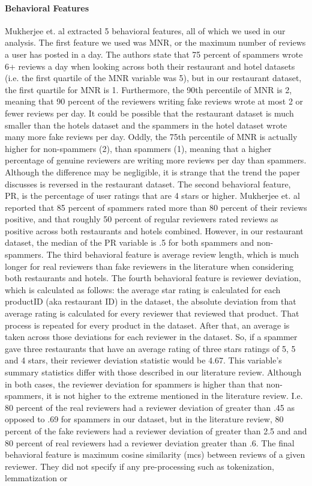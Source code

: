 \documentclass[man, floatsintext, 10pt]{apa6}
\begin{document}
\vspace{2mm}

\paragraph{Behavioral Features} Mukherjee et. al extracted 5 behavioral features, all of which we used in our analysis. The first feature we used was MNR, or the maximum number of reviews a user has posted in a day. The authors state that 75 percent of spammers wrote 6+ reviews a day when looking across both their restaurant and hotel datasets (i.e. the first quartile of the MNR variable was 5), but in our restaurant dataset, the first quartile for MNR is 1. Furthermore, the 90th percentile of MNR is 2, meaning that 90 percent of the reviewers writing fake reviews wrote at most 2 or fewer reviews per day. It could be possible that the restaurant dataset is much smaller than the hotels dataset and the spammers in the hotel dataset wrote many more fake reviews per day.  Oddly, the 75th percentile of MNR is actually higher for non-spammers (2), than spammers (1), meaning that a higher percentage of genuine reviewers are writing more reviews per day than spammers. Although the difference may be negligible, it is strange that the trend the paper discusses is reversed in the restaurant dataset. The second behavioral feature, PR, is the percentage of user ratings that are 4 stars or higher. Mukherjee et. al reported that 85 percent of spammers rated more than 80 percent of their reviews positive, and that roughly 50 percent of regular reviewers rated reviews as positive across both restaurants and hotels combined.  However, in our restaurant dataset, the median of the PR variable is .5 for both spammers and non-spammers. The third behavioral feature is average review length, which is much longer for real reviewers than fake reviewers in the literature when considering both restaurants and hotels.  The fourth behavioral feature is reviewer deviation, which is calculated as follows: the average star rating is calculated for each productID (aka restaurant ID) in the dataset, the absolute deviation from that average rating is calculated for every reviewer that reviewed that product. That process is repeated for every product in the dataset. After that, an average is taken across those deviations for each reviewer in the dataset. So, if a spammer gave three restaurants that have an average rating of three stars ratings of 5, 5 and 4 stars, their reviewer deviation statistic would be 4.67. This variable's summary statistics differ with those described in our literature review. Although in both cases, the reviewer deviation for spammers is higher than that non-spammers, it is not higher to the extreme  mentioned in the literature review. I.e. 80 percent of the real reviewers had a reviewer deviation of greater than .45 as opposed to .69 for spammers in our dataset, but in the literature review, 80 percent of the fake reviewers had a reviewer deviation of greater than 2.5 and and 80 percent of real reviewers had a reviewer deviation greater than .6. The final behavioral feature is maximum cosine similarity (mcs) between reviews of a given reviewer. They did not specify if any pre-processing such as tokenization, lemmatization or 
\end{document}
